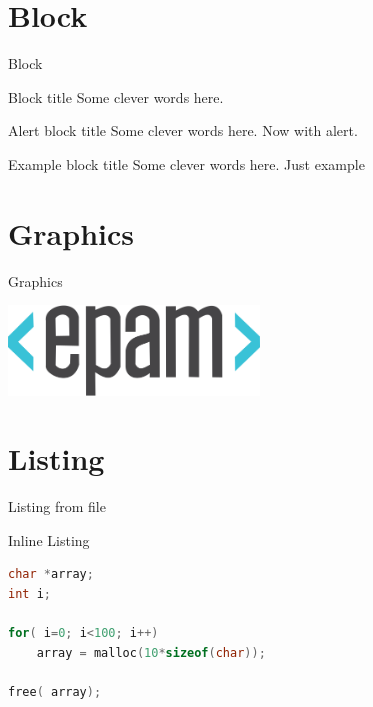 \section{Block}
\begin{frame}{Block}
	\begin{block}{Block title}
	    Some clever words here.
	\end{block}
	\begin{alertblock}{Alert block title}
	    Some clever words here. Now with alert.
	\end{alertblock}
	\begin{exampleblock}{Example block title}
	    Some clever words here. Just example
	\end{exampleblock}
\end{frame}

\section{Graphics}
\begin{frame}{Graphics}
    \begin{center}
	\includegraphics[width=0.5\textwidth]{epam_primary}
    \end{center}
\end{frame}

\section{Listing}
\begin{frame}[fragile]{Listing from file}

    

\end{frame}

\begin{frame}[fragile]{Inline Listing}

	\begin{lstlisting}[language=C]
char *array;
int i;

for( i=0; i<100; i++)
    array = malloc(10*sizeof(char));

free( array);
	\end{lstlisting}
\end{frame}

